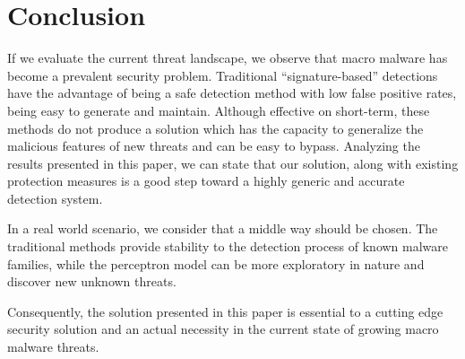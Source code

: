 \section{Conclusion}
\par
If we evaluate the current threat landscape, we observe that macro malware has become a prevalent security problem. 
Traditional “signature-based” detections have the advantage of being a safe detection method with low false positive rates, being easy to generate and maintain. Although effective on short-term, these methods do not produce a solution which has the capacity to generalize the malicious features of new threats and can be easy to bypass. Analyzing the results presented in this paper, we can state that our solution, along with existing protection measures is a good step toward a highly generic and accurate detection system. 
\par
In a real world scenario, we consider that a middle way should be chosen. The traditional methods provide stability to the detection process of known malware families, while the perceptron model can be more exploratory in nature and discover new unknown threats.
\par
Consequently, the solution presented in this paper is essential to a cutting edge security solution and an actual necessity in the current state of growing macro malware threats.
